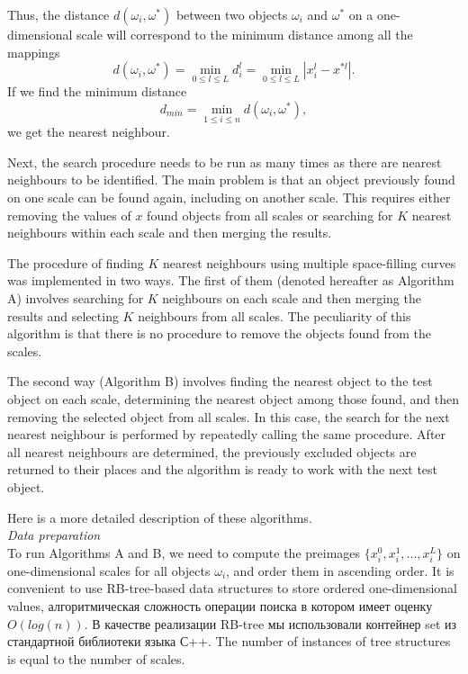 \documentclass[entropy,article,submit,moreauthors,pdftex]{Definitions/mdpi}
\begin{document}
\begin{paracol}{2}
Thus, the distance $d(\omega_i,\omega^*)$ between two objects $\omega_i$ and $\omega^*$ on a one-dimensional scale will correspond to the minimum distance among all the mappings 
\[
d(\omega_i,\omega^*) = \min_{0\leq l\leq L} d_i^l = \min_{0\leq l\leq L}  |x_i^l - x^{*l}| .
\]
If we find the minimum distance
\[
d_{min} = \min_{1\leq i\leq n} d(\omega_i,\omega^*) ,
\]
we get the nearest neighbour.

Next, the search procedure needs to be run as many times as there are nearest neighbours to be identified. The main problem is that an object previously found on one scale can be found again, including on another scale. This requires either removing the values of $x$ found objects from all scales or searching for $K$ nearest neighbours within each scale and then merging the results.



The procedure of finding $K$ nearest neighbours using multiple space-filling curves was implemented in two ways. The first of them (denoted hereafter as Algorithm A) involves searching for $K$ neighbours on each scale and then merging the results and selecting $K$ neighbours from all scales. The peculiarity of this algorithm is that there is no procedure to remove the objects found from the scales.

The second way (Algorithm B) involves finding the nearest object to the test object on each scale, determining the nearest object among those found, and then removing the selected object from all scales. In this case, the search for the next nearest neighbour is performed by repeatedly calling the same procedure. After all nearest neighbours are determined, the previously excluded objects are returned to their places and the algorithm is ready to work with the next test object.

Here is a more detailed description of these algorithms.
\\[12pt]
\textit{Data preparation}
\\[12pt]
To run Algorithms A and B, we need to compute the preimages $\{x_i^0, x_i^1, ..., x_i^L\}$ on one-dimensional scales for all objects $\omega_i$, and order them in ascending order. It is convenient to use RB-tree-based data structures to store ordered one-dimensional values,
алгоритмическая сложность операции поиска в котором имеет оценку $O(log(n))$. В качестве реализации RB-tree мы использовали контейнер set из стандартной библиотеки языка С++.
The number of instances of tree structures is equal to the number of scales.


\end{paracol}
\end{document}
